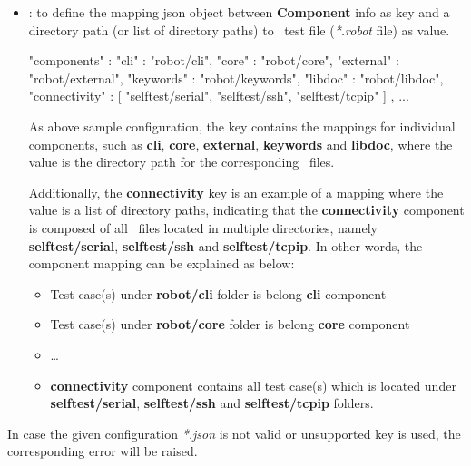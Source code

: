 \begin{itemize}
\begin{itemize}
\begin{itemize}
                      for all test casea within this execution.
\begin{robotcode}
{
  "components" : "atest",
  ...
}
\end{robotcode}
                \item {}: to define the mapping json object between
                      \textbf{Component} info as key and a directory path (or
                      list of directory paths) to \rfwcore\ test file
                      (\emph{*.robot} file) as value.
\begin{robotcode}
  {
    "components" : {
      "cli"       : "robot/cli",
      "core"      : "robot/core",
      "external"  : "robot/external",
      "keywords"  : "robot/keywords",
      "libdoc"    : "robot/libdoc",
      "connectivity" : [
          "selftest/serial",
          "selftest/ssh",
          "selftest/tcpip"
      ]
    },
    ...
  }
\end{robotcode}
                As above sample configuration, the  key
                contains the mappings for individual components, such as
                \textbf{cli}, \textbf{core}, \textbf{external},
                \textbf{keywords} and \textbf{libdoc}, where the value is the
                directory path for the corresponding \rfwcore\ files.

                Additionally, the \textbf{connectivity} key is an example of a
                mapping where the value is a list of directory paths, indicating
                that the \textbf{connectivity} component is composed of all
                \rfwcore\ files located in multiple directories, namely
                \textbf{selftest/serial}, \textbf{selftest/ssh} and
                \textbf{selftest/tcpip}.
                \newline
                In other words, the component mapping can be explained as below:
                \begin{itemize}
                  \item Test case(s) under \textbf{robot/cli} folder is belong
                        \textbf{cli} component
                  \item Test case(s) under \textbf{robot/core} folder is belong
                        \textbf{core} component
                  \item \dots
                  \item \textbf{connectivity} component contains all test case(s)
                        which is located under \textbf{selftest/serial},
                        \textbf{selftest/ssh} and \textbf{selftest/tcpip} folders.
                \end{itemize}
              \end{itemize}
          \end{itemize}

          In case the given configuration \emph{*.json} is not valid or
          unsupported key is used, the corresponding error will be raised.
      \end{itemize}

